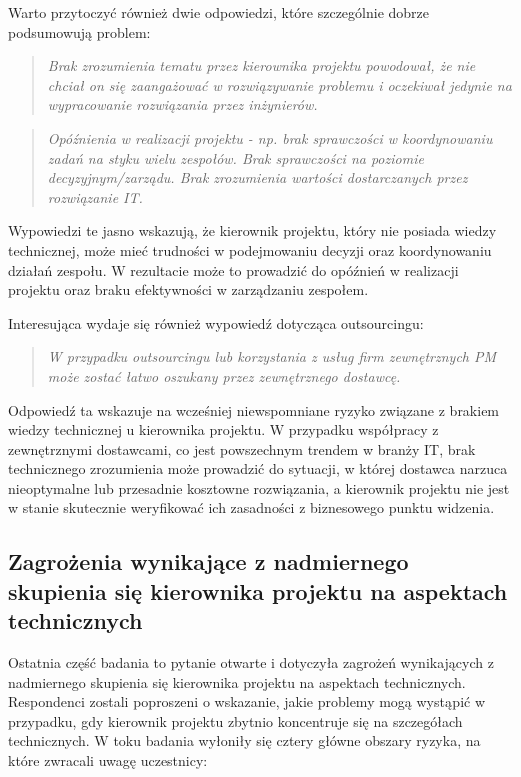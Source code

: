 Warto przytoczyć również dwie odpowiedzi, które szczególnie dobrze podsumowują problem:
\begin{quote}
  \textit{Brak zrozumienia tematu przez kierownika projektu powodował, że nie chciał on się zaangażować w rozwiązywanie problemu i oczekiwał jedynie na wypracowanie rozwiązania przez inżynierów.}
\end{quote}
\begin{quote}
  \textit{Opóźnienia w realizacji projektu - np. brak sprawczości w koordynowaniu zadań na styku wielu zespołów. Brak sprawczości na poziomie decyzyjnym/zarządu. Brak zrozumienia wartości dostarczanych przez rozwiązanie IT.}
\end{quote}

Wypowiedzi te jasno wskazują, że kierownik projektu, który nie posiada wiedzy technicznej, może mieć trudności w podejmowaniu decyzji oraz koordynowaniu działań zespołu. W rezultacie może to prowadzić do opóźnień w realizacji projektu oraz braku efektywności w zarządzaniu zespołem.

Interesująca wydaje się również wypowiedź dotycząca outsourcingu:
\begin{quote}
  \textit{W przypadku outsourcingu lub korzystania z usług firm zewnętrznych PM może zostać łatwo oszukany przez zewnętrznego dostawcę.}
\end{quote}

Odpowiedź ta wskazuje na wcześniej niewspomniane ryzyko związane z brakiem wiedzy technicznej u kierownika projektu. W przypadku współpracy z zewnętrznymi dostawcami, co jest powszechnym trendem w branży IT, brak technicznego zrozumienia może prowadzić do sytuacji, w której dostawca narzuca nieoptymalne lub przesadnie kosztowne rozwiązania, a kierownik projektu nie jest w stanie skutecznie weryfikować ich zasadności z biznesowego punktu widzenia.

\subsection{Zagrożenia wynikające z nadmiernego skupienia się kierownika projektu na aspektach technicznych}
Ostatnia część badania to pytanie otwarte i dotyczyła zagrożeń wynikających z nadmiernego skupienia się kierownika projektu na aspektach technicznych. Respondenci zostali poproszeni o wskazanie, jakie problemy mogą wystąpić w przypadku, gdy kierownik projektu zbytnio koncentruje się na szczegółach technicznych. W toku badania wyłoniły się cztery główne obszary ryzyka, na które zwracali uwagę uczestnicy:


